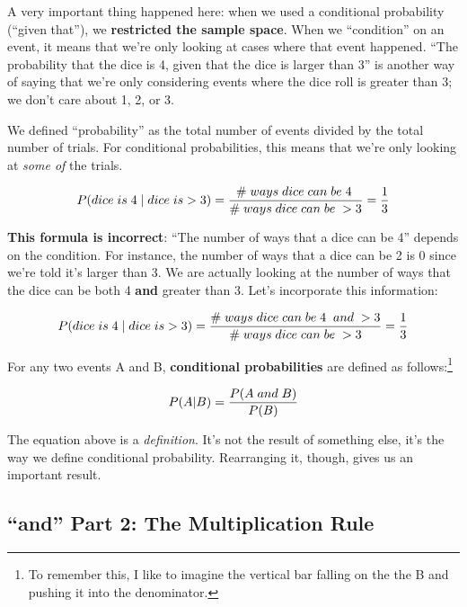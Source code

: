 \documentclass[
  letterpaper,
  DIV=11,
  numbers=noendperiod]{scrreprt}
\begin{document}
A very important thing happened here: when we used a conditional
probability (``given that''), we \textbf{restricted the sample space}.
When we ``condition'' on an event, it means that we're only looking at
cases where that event happened. ``The probability that the dice is 4,
given that the dice is larger than 3'' is another way of saying that
we're only considering events where the dice roll is greater than 3; we
don't care about 1, 2, or 3.

We defined ``probability'' as the total number of events divided by the
total number of trials. For conditional probabilities, this means that
we're only looking at \emph{some of} the trials.

\begin{align*}
\small P(dice\; is\; 4\; |\; dice\; is >3) = \frac{\#\; ways\;dice\;can\;be\;4\;}{\#\;ways\;dice\;can\;be\;>3}=\frac{1}{3}
\end{align*}

\textbf{This formula is incorrect}: ``The number of ways that a dice can
be 4'' depends on the condition. For instance, the number of ways that a
dice can be 2 is 0 since we're told it's larger than 3. We are actually
looking at the number of ways that the dice can be both 4 \textbf{and}
greater than 3. Let's incorporate this information:

\begin{align*}
\small P(dice\; is\; 4\; |\; dice\; is >3) = \frac{\#\; ways\;dice\;can\;be\;4\;\;and\;>3}{\#\;ways\;dice\;can\;be\;>3}=\frac{1}{3}
\end{align*}

For any two events A and B, \textbf{conditional probabilities} are
defined as follows:\footnote{To remember this, I like to imagine the
  vertical bar falling on the the B and pushing it into the denominator.}

\begin{align*}
\small P(A | B) = \frac{P(A\;and\; B)}{P(B)}
\end{align*}

The equation above is a \emph{definition}. It's not the result of
something else, it's the way we define conditional probability.
Rearranging it, though, gives us an important result.

\hypertarget{and-part-2-the-multiplication-rule}{%
\subsection{``and'' Part 2: The Multiplication
Rule}\label{and-part-2-the-multiplication-rule}}
\end{document}
